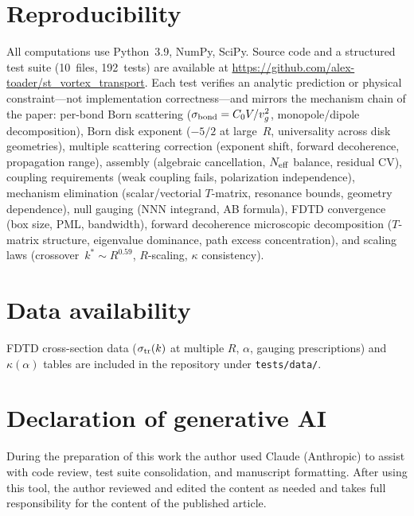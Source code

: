 \documentclass[aps,prl,twocolumn,superscriptaddress]{revtex4-2}
\begin{document}
\section*{Reproducibility}

All computations use Python~3.9, NumPy, SciPy. Source code and a structured
test suite (10~files, 192~tests) are available at
\url{https://github.com/alex-toader/st_vortex_transport}. Each test verifies
an analytic prediction or physical constraint---not implementation
correctness---and mirrors the mechanism chain of the paper: per-bond Born
scattering ($\sigma_{\rm bond} = C_0 V/v_g^2$, monopole/dipole
decomposition), Born disk exponent ($-5/2$ at large~$R$, universality across
disk geometries), multiple scattering correction (exponent shift, forward
decoherence, propagation range), assembly (algebraic cancellation,
$N_{\rm eff}$ balance, residual CV), coupling requirements (weak coupling
fails, polarization independence), mechanism elimination (scalar/vectorial
$T$-matrix, resonance bounds, geometry dependence), null gauging (NNN
integrand, AB formula), FDTD convergence (box size, PML, bandwidth),
forward decoherence microscopic decomposition ($T$-matrix structure,
eigenvalue dominance, path excess concentration), and scaling laws
(crossover~$k^* \sim R^{0.59}$, $R$-scaling, $\kappa$
consistency).

\section*{Data availability}

FDTD cross-section data ($\sigma_{\rm tr}(k)$ at multiple $R$, $\alpha$,
gauging prescriptions) and $\kappa(\alpha)$ tables are included in the
repository under \texttt{tests/data/}.

\section*{Declaration of generative AI}

During the preparation of this work the author used Claude (Anthropic) to
assist with code review, test suite consolidation, and manuscript formatting.
After using this tool, the author reviewed and edited the content as needed
and takes full responsibility for the content of the published article.

\end{document}
